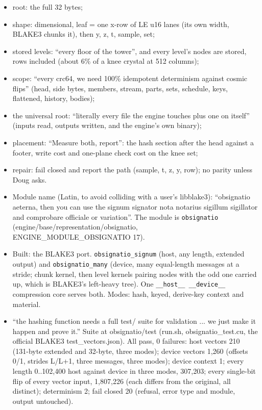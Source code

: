 \begin{itemize}
\item root: the full 32 bytes;
\item shape: dimensional, leaf = one x-row of LE u16 lanes (its own width, BLAKE3 chunks it), then y, z, t, sample, set;
\item stored levels: “every floor of the tower”, and every level's nodes are stored, rows included (about 6\% of a knee crystal at 512 columns);
\item scope: “every crc64, we need 100\% idempotent determinism against cosmic flips” (head, side bytes, members, stream, parts, sets, schedule, keys, flattened, history, bodies);
\item the universal root: “literally every file the engine touches plus one on itself” (inputs read, outputs written, and the engine's own binary);
\item placement: “Measure both, report”: the hash section after the head against a footer, write cost and one-plane check cost on the knee set;
\item repair: fail closed and report the path (sample, t, z, y, row); no parity unless Doug asks.
\item Module name (Latin, to avoid colliding with a user's libblake3): “obsignatio aeterna, then you can use the signum signator nota notarius sigillum sigillator and comprobare officiale or variation”. The module is \texttt{obsignatio} (engine/base/representation/obsignatio, ENGINE\_\allowbreak{}MODULE\_\allowbreak{}OBSIGNATIO 17).
\item Built: the BLAKE3 port. \texttt{obsignatio\_\allowbreak{}signum} (host, any length, extended output) and \texttt{obsignatio\_\allowbreak{}many} (device, many equal-length messages at a stride; chunk kernel, then level kernels pairing nodes with the odd one carried up, which is BLAKE3's left-heavy tree). One \texttt{\_\allowbreak{}\_\allowbreak{}host\_\allowbreak{}\_\allowbreak{} \_\allowbreak{}\_\allowbreak{}device\_\allowbreak{}\_\allowbreak{}} compression core serves both. Modes: hash, keyed, derive-key context and material.
\item “the hashing function needs a full test/ suite for validation ... we just make it happen and prove it.” Suite at obsignatio/test (run.sh, obsignatio\_\allowbreak{}test.cu, the official BLAKE3 test\_\allowbreak{}vectors.json). All pass, 0 failures: host vectors 210 (131-byte extended and 32-byte, three modes); device vectors 1,260 (offsets 0/1, strides L/L+1, three messages, three modes); device context 1; every length 0..102,400 host against device in three modes, 307,203; every single-bit flip of every vector input, 1,807,226 (each differs from the original, all distinct); determinism 2; fail closed 20 (refusal, error type and module, output untouched).

\end{itemize}
